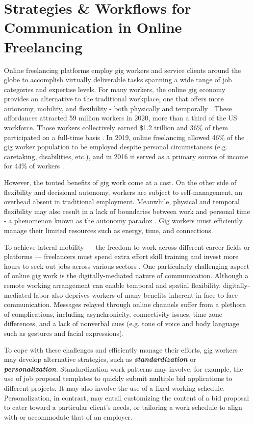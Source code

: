 \chapter{Strategies \& Workflows for Communication in Online Freelancing} \label{freelance}

Online freelancing platforms employ gig workers and service clients around the globe to accomplish virtually deliverable tasks spanning a wide range of job categories and expertise levels. For many workers, the online gig economy provides an alternative to the traditional workplace, one that offers more autonomy, mobility, and flexibility - both physically and temporally \cite{dunn2017digital, boundary}. These affordances attracted 59 million workers in 2020, more than a third of the US workforce. Those workers collectively earned \$1.2 trillion and 36\% of them participated on a full-time basis \cite{freelance-forward}. In 2019, online freelancing allowed 46\% of the gig worker population to be employed despite personal circumstances (e.g. caretaking, disabilities, etc.), and in 2016 it served as a primary source of income for 44\% of workers \cite{manyika2016independent}. 

However, the touted benefits of gig work come at a cost. On the other side of flexibility and decisional autonomy, workers are subject to self-management, an overhead absent in traditional employment. Meanwhile, physical and temporal flexibility may also result in a lack of boundaries between work and personal time - a phenomenon known as the autonomy paradox \cite{Shevchuk_Strebkov_Davis_2019}. Gig workers must efficiently manage their limited resources such as energy, time, and connections.

To achieve lateral mobility --- the freedom to work across different career fields or platforms --- freelancers must spend extra effort skill training and invest more hours to seek out jobs across various sectors \cite{boundary}. One particularly challenging aspect of online gig work is the digitally-mediated nature of communication. Although a remote working arrangement can enable temporal and spatial flexibility, digitally-mediated labor also deprives workers of many benefits inherent in face-to-face communication. Messages relayed through online channels suffer from a plethora of complications, including asynchronicity, connectivity issues, time zone differences, and a lack of nonverbal cues (e.g. tone of voice and body language such as gestures and facial expressions). 

To cope with these challenges and efficiently manage their efforts, gig workers may develop alternative strategies, such as \textbf{\textit{standardization}} or \textbf{\textit{personalization}}. Standardization work patterns may involve, for example, the use of job proposal templates to quickly submit multiple bid applications to different projects. It may also involve the use of a fixed working schedule. Personalization, in contrast, may entail customizing the content of a bid proposal to cater toward a particular client's needs, or tailoring a work schedule to align with or accommodate that of an employer.

